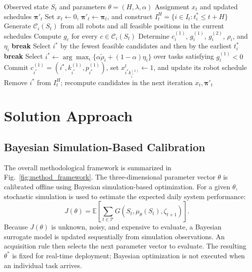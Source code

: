 \documentclass[11pt,oneside]{article}
\begin{document}
\begin{algorithm}[H]
\caption{Profit-oriented rolling-horizon insertion at decision time \(t\)}
\label{alg:profit_insertion}
\begin{algorithmic}[1]
\Require Observed state \(S_t\) and parameters \(\theta=(H,\lambda,\alpha)\)
\Ensure Assignment \(x_t\) and updated schedules \(\boldsymbol{\pi}'_t\)
\State Set \(x_t\gets 0\), \(\boldsymbol{\pi}'_t\gets\boldsymbol{\pi}_t\),
and construct \(I_t^H=\{i\in I_t:t_i^*\leq t+H\}\)
        \State Generate \(\mathcal C_i(S_t)\) from all robots and all
        feasible positions in the current schedules
        \label{alg:best_candidate_start}
            \State Compute \(g_c\) for every \(c\in\mathcal C_i(S_t)\)
            \State Determine \(c_i^{(1)}\), \(g_i^{(1)}\),
            \(g_i^{(2)}\), \(\rho_i\), and \(\eta_i\)
        \EndIf
        \label{alg:best_candidate_end}
    \EndFor
        \State \textbf{break}
        \State Select \(i^*\) by the fewest feasible candidates and then
        by the earliest \(t_i^*\)
        \State \textbf{break}
    \Else
        \State Select
        \(i^*\gets\arg\max_i
        \{\alpha\widetilde\rho_i+(1-\alpha)\eta_i\}\)
        over tasks satisfying \(g_i^{(1)}<0\)
    \EndIf
    \State Commit \(c_{i^*}^{(1)}
    =(i^*,k_{i^*}^{(1)},p_{i^*}^{(1)})\), set
    \(x_{i^*k_{i^*}^{(1)}}^t\gets1\), and update its robot schedule
    \label{alg:commit_candidate}
    \State Remove \(i^*\) from \(I_t^H\); recompute candidates in the next
    iteration
\EndWhile
\State \Return \(x_t,\boldsymbol{\pi}'_t\)
\end{algorithmic}
\end{algorithm}

\section{Solution Approach}


\subsection{Bayesian Simulation-Based Calibration}

The overall methodological framework is summarized in
Fig.~\ref{fig:method_framework}. The three-dimensional parameter vector
\(\theta\) is calibrated offline using Bayesian simulation-based
optimization. For a given \(\theta\), stochastic simulation is used to
estimate the expected daily system performance:
\[
J(\theta)
=
\mathbb E
\left[
\sum_{t\in\mathcal T}
G\!\left(
S_t,\mu_\theta(S_t),\zeta_{t+1}
\right)
\right].
\]
Because \(J(\theta)\) is unknown, noisy, and expensive to evaluate, a Bayesian
surrogate model is updated sequentially from simulation observations. An
acquisition rule then selects the next parameter vector to evaluate. The
resulting \(\theta^\ast\) is fixed for real-time deployment; Bayesian
optimization is not executed when an individual task arrives.
\end{document}
